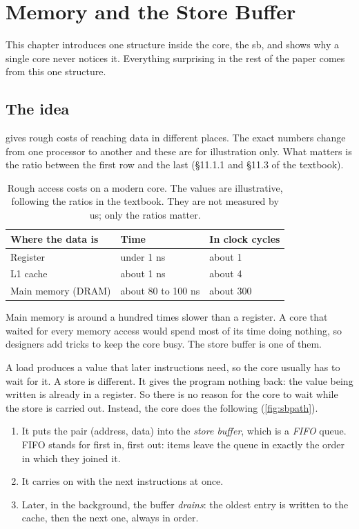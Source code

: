 \chapter{Memory and the Store Buffer}
\label{ch:storebuf}

This chapter introduces one structure inside the core, the \gls{sb}, and shows why a single core never notices it. Everything surprising in the rest of the paper comes from this one structure.

\section{The idea}
\label{sec:sbidea}

 gives rough costs of reaching data in different places. The exact numbers change from one processor to another and these are for illustration only. What matters is the ratio between the first row and the last (\S11.1.1 and \S11.3 of the textbook\cite{sarangiBasic}).

\begin{table}[!htbp]
\centering\small
\caption{Rough access costs on a modern core. The values are illustrative, following the ratios in the textbook\cite{sarangiBasic}. They are not measured by us; only the ratios matter.}
\label{tab:latency}
\begin{tabular}{@{}lll@{}}
\toprule
Where the data is & Time & In clock cycles\\
\midrule
Register & under 1 ns & about 1\\
L1 cache & about 1 ns & about 4\\
Main memory (DRAM) & about 80 to 100 ns & about 300\\
\bottomrule
\end{tabular}
\end{table}

Main memory is around a hundred times slower than a register. A core that waited for every memory access would spend most of its time doing nothing, so designers add tricks to keep the core busy. The store buffer is one of them.

A load produces a value that later instructions need, so the core usually has to wait for it. A store is different. It gives the program nothing back: the value being written is already in a register. So there is no reason for the core to wait while the store is carried out. Instead, the core does the following (\cref{fig:sbpath}).
\begin{enumerate}
\item It puts the pair (address, data) into the \emph{store buffer}, which is a \emph{FIFO} queue. FIFO stands for first in, first out: items leave the queue in exactly the order in which they joined it.
\item It carries on with the next instructions at once.
\item Later, in the background, the buffer \emph{drains}: the oldest entry is written to the cache, then the next one, always in order.
\end{enumerate}

